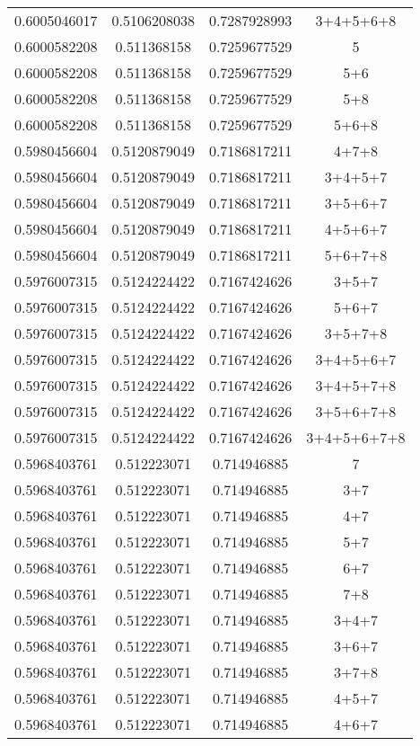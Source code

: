 \documentclass[]{article}
\begin{document}
\begin{longtable}{| c | c | c | c |}
		0.6005046017 & 0.5106208038 & 0.7287928993 & 3+4+5+6+8 \\
		0.6000582208 & 0.511368158 & 0.7259677529 & 5 \\
		0.6000582208 & 0.511368158 & 0.7259677529 & 5+6 \\
		0.6000582208 & 0.511368158 & 0.7259677529 & 5+8 \\
		0.6000582208 & 0.511368158 & 0.7259677529 & 5+6+8 \\
		0.5980456604 & 0.5120879049 & 0.7186817211 & 4+7+8 \\
		0.5980456604 & 0.5120879049 & 0.7186817211 & 3+4+5+7 \\
		0.5980456604 & 0.5120879049 & 0.7186817211 & 3+5+6+7 \\
		0.5980456604 & 0.5120879049 & 0.7186817211 & 4+5+6+7 \\
		0.5980456604 & 0.5120879049 & 0.7186817211 & 5+6+7+8 \\
		0.5976007315 & 0.5124224422 & 0.7167424626 & 3+5+7 \\
		0.5976007315 & 0.5124224422 & 0.7167424626 & 5+6+7 \\
		0.5976007315 & 0.5124224422 & 0.7167424626 & 3+5+7+8 \\
		0.5976007315 & 0.5124224422 & 0.7167424626 & 3+4+5+6+7 \\
		0.5976007315 & 0.5124224422 & 0.7167424626 & 3+4+5+7+8 \\
		0.5976007315 & 0.5124224422 & 0.7167424626 & 3+5+6+7+8 \\
		0.5976007315 & 0.5124224422 & 0.7167424626 & 3+4+5+6+7+8 \\
		0.5968403761 & 0.512223071 & 0.714946885 & 7 \\
		0.5968403761 & 0.512223071 & 0.714946885 & 3+7 \\
		0.5968403761 & 0.512223071 & 0.714946885 & 4+7 \\
		0.5968403761 & 0.512223071 & 0.714946885 & 5+7 \\
		0.5968403761 & 0.512223071 & 0.714946885 & 6+7 \\
		0.5968403761 & 0.512223071 & 0.714946885 & 7+8 \\
		0.5968403761 & 0.512223071 & 0.714946885 & 3+4+7 \\
		0.5968403761 & 0.512223071 & 0.714946885 & 3+6+7 \\
		0.5968403761 & 0.512223071 & 0.714946885 & 3+7+8 \\
		0.5968403761 & 0.512223071 & 0.714946885 & 4+5+7 \\
		0.5968403761 & 0.512223071 & 0.714946885 & 4+6+7 \\

\end{longtable}
\end{document}
